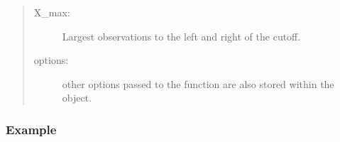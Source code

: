 \documentclass[letterpaper,10pt,english]{sphinxmanual}
\begin{document}
\begin{fulllineitems}
\begin{quote}
\begin{description}
\begin{description}
\item[{X\_max:}] \leavevmode
\sphinxAtStartPar
Largest observations to the left and right of the cutoff.

\item[{options:}] \leavevmode
\sphinxAtStartPar
other options passed to the function are also stored within the object.

\end{description}

\end{description}\end{quote}


\nopagebreak

\begin{description}
\item[{{\hyperref[\detokenize{rdbwdensity:module-rddensity.rdbwdensity}]{}}}] \leavevmode
\item[{{\hyperref[\detokenize{rdplotdensity:module-rddensity.rdplotdensity}]{}}}] \leavevmode
\end{description}



\end{fulllineitems}



\subsubsection{Example}
\label{\detokenize{rddensity:example}}
\begin{sphinxVerbatim}[commandchars=\\\{\}]
   
   
  
   
\end{sphinxVerbatim}
\end{document}
